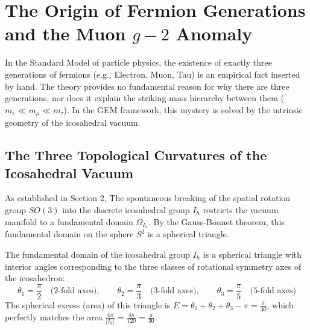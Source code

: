 \section{The Origin of Fermion Generations and the Muon $g-2$ Anomaly}
\label{sec:generations}
In the Standard Model of particle physics, the existence of exactly three generations of fermions (e.g., Electron, Muon, Tau) is an empirical fact inserted by hand. The theory provides no fundamental reason for why there are three generations, nor does it explain the striking mass hierarchy between them ($m_e \ll m_\mu \ll m_\tau$). In the GEM framework, this mystery is solved by the intrinsic geometry of the icosahedral vacuum.

\subsection{The Three Topological Curvatures of the Icosahedral Vacuum}

As established in Section 2, The spontaneous breaking of the spatial rotation group $SO(3)$ into the discrete icosahedral group $I_h$ restricts the vacuum manifold to a fundamental domain $\Omega_{I_h}$. By the Gauss-Bonnet theorem, this fundamental domain on the sphere $S^2$ is a spherical triangle.

\begin{definition}
The fundamental domain of the icosahedral group $I_h$ is a spherical triangle with interior angles corresponding to the three classes of rotational symmetry axes of the icosahedron:
\begin{equation}
    \theta_1 = \frac{\pi}{2} \quad \text{(2-fold axes)}, \qquad 
    \theta_2 = \frac{\pi}{3} \quad \text{(3-fold axes)}, \qquad 
    \theta_3 = \frac{\pi}{5} \quad \text{(5-fold axes)}
\end{equation}
The spherical excess (area) of this triangle is $E = \theta_1 + \theta_2 + \theta_3 - \pi = \frac{\pi}{30}$, which perfectly matches the area $\frac{4\pi}{|I_h|} = \frac{4\pi}{120} = \frac{\pi}{30}$.
\end{definition}

